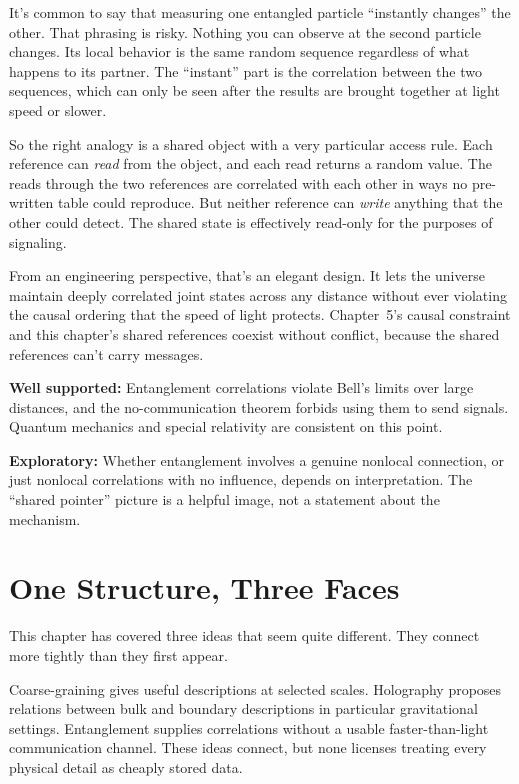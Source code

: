 \begin{beginnermistakebox}
It's common to say that measuring one entangled particle ``instantly changes'' the other. That phrasing is risky. Nothing you can observe at the second particle changes. Its local behavior is the same random sequence regardless of what happens to its partner. The ``instant'' part is the correlation between the two sequences, which can only be seen after the results are brought together at light speed or slower.
\end{beginnermistakebox}

So the right analogy is a shared object with a very particular access rule. Each reference can \emph{read} from the object, and each read returns a random value. The reads through the two references are correlated with each other in ways no pre-written table could reproduce. But neither reference can \emph{write} anything that the other could detect. The shared state is effectively read-only for the purposes of signaling.

From an engineering perspective, that's an elegant design. It lets the universe maintain deeply correlated joint states across any distance without ever violating the causal ordering that the speed of light protects. Chapter~5's causal constraint and this chapter's shared references coexist without conflict, because the shared references can't carry messages.

\begin{researchnotebox}
\textbf{Well supported:} Entanglement correlations violate Bell's limits over large distances, and the no-communication theorem forbids using them to send signals. Quantum mechanics and special relativity are consistent on this point.

\textbf{Exploratory:} Whether entanglement involves a genuine nonlocal connection, or just nonlocal correlations with no influence, depends on interpretation. The ``shared pointer'' picture is a helpful image, not a statement about the mechanism.
\end{researchnotebox}

\section{One Structure, Three Faces}

This chapter has covered three ideas that seem quite different. They connect more tightly than they first appear.

Coarse-graining gives useful descriptions at selected scales. Holography proposes relations between bulk and boundary descriptions in particular gravitational settings. Entanglement supplies correlations without a usable faster-than-light communication channel. These ideas connect, but none licenses treating every physical detail as cheaply stored data.

